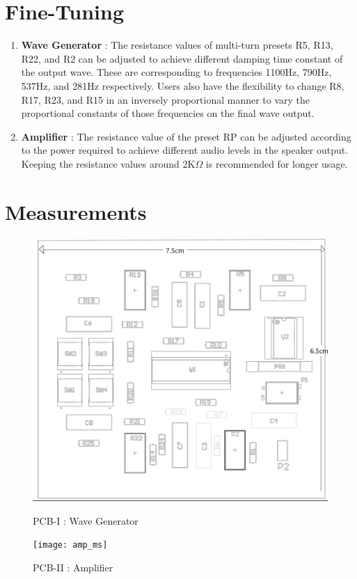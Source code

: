 \documentclass[a4paper,12pt,oneside,pdflatex,italian,final,twocolumn]{article}
\begin{document}
\section{Fine-Tuning}
\vspace{-0.2cm}
\begin{enumerate}
    \item \textbf{Wave Generator} : The resistance values of multi-turn presets  R5, R13, R22, and R2 can be adjusted to achieve different damping time constant of the output wave. These are corresponding to frequencies 1100Hz, 790Hz, 537Hz, and 281Hz respectively. Users also have the flexibility to change R8, R17, R23, and R15 in an inversely proportional manner to vary the proportional constants of those frequencies on the final wave output.
    \vspace{-.3cm}
    \item \textbf{Amplifier} : The resistance value of the preset RP can be adjusted according to the power required to achieve different audio levels in the speaker output. Keeping the resistance values around 2K$\Omega$ is recommended for longer usage.
\end{enumerate}

\vspace{-1cm}
\section{Measurements}
\vspace{-.4cm}
\begin{figure}[h]
    \begin{minipage}{0.45\textwidth}
        \centering
        \includegraphics[width=.65\textwidth]{osc_ms}
        \caption*{PCB-I : Wave Generator}
        \label{pcb_1}
    \end{minipage}
        \hfill
        \begin{minipage}{0.45\textwidth}
        \centering
        \texttt{[image: amp\_ms]}
        \caption*{PCB-II : Amplifier}
        \label{pcb_2}
    \end{minipage}
\end{figure}
\vspace{-1.3cm}
\end{document}
